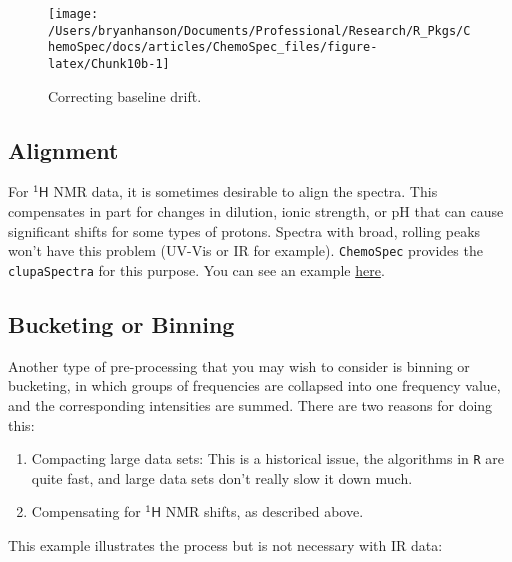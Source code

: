 \documentclass[letter,10pt,twocolumn,twoside,printwatermark=false]{pinp}
\begin{document}
\begin{figure}

{\centering \texttt{[image: /Users/bryanhanson/Documents/Professional/Research/R\_Pkgs/ChemoSpec/docs/articles/ChemoSpec\_files/figure-latex/Chunk10b-1]} 

}

\caption{\label{baseline}Correcting baseline drift.}\label{fig:Chunk10b}
\end{figure}

\hypertarget{alignment}{%
\subsection{Alignment}\label{alignment}}

For \(\mathsf{^{1}H}\) NMR data, it is sometimes desirable to align the
spectra. This compensates in part for changes in dilution, ionic
strength, or pH that can cause significant shifts for some types of
protons. Spectra with broad, rolling peaks won't have this problem
(UV-Vis or IR for example). \texttt{ChemoSpec} provides the
\texttt{clupaSpectra} for this purpose. You can see an example
\href{http://www.validnmr.com/w/index.php?title=Chemometrics}{here}.

\hypertarget{bucketing-or-binning}{%
\subsection{Bucketing or Binning}\label{bucketing-or-binning}}

Another type of pre-processing that you may wish to consider is binning
or bucketing, in which groups of frequencies are collapsed into one
frequency value, and the corresponding intensities are summed. There are
two reasons for doing this:

\begin{enumerate}
  \item Compacting large data sets:  This is a historical issue, the algorithms in \texttt{R} are quite fast, and large data sets don't really slow it down much.
  \item  Compensating for $\mathsf{^{1}H}$ NMR shifts, as described above.
\end{enumerate}

This example illustrates the process but is not necessary with IR data:

\begin{Shaded}
\begin{Highlighting}[]
\StringTok{ } \NormalTok{)}
\end{Highlighting}
\end{Shaded}
\end{document}

